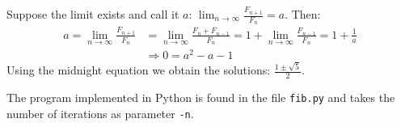 \documentclass[10pt,a4paper,boxed]{hmcpset}
\begin{document}
\begin{problem}[Assignment 35]
\end{problem}
\begin{solution}
Suppose the limit exists and call it $a$: $\lim_{n \rightarrow \infty} \frac{F_{n+1}}{F_n} = a$. Then:
\begin{align*}
	a = \lim_{n \rightarrow \infty} \frac{F_{n+1}}{F_n} & = \lim_{n \rightarrow \infty} \frac{F_{n}+F_{n-1}}{F_n} = 1 + \lim_{n \rightarrow \infty} \frac{F_{n-1}}{F_n} = 1 + \frac{1}{a} \\
	& \Rightarrow 0 = a^2 - a - 1 
\end{align*}
Using the midnight equation we obtain the solutions: $\frac{1 \pm \sqrt{5}}{2}$.

The program implemented in Python is found in the file \verb|fib.py| and takes the number of iterations as parameter \verb|-n|.
\end{solution}

\begin{problem}[Assignment 36]
\end{problem}
\begin{solution}
\end{solution}
\end{document}
